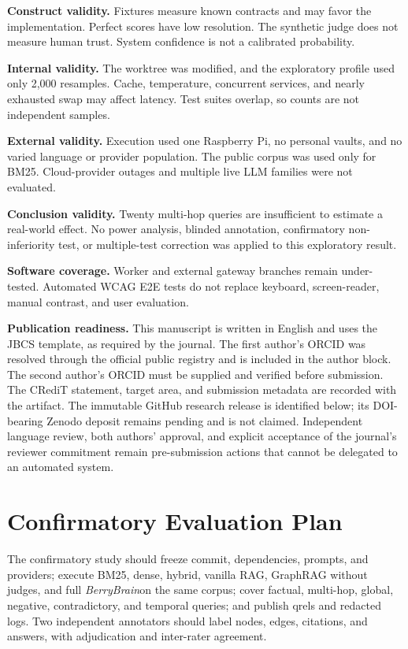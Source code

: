 \documentclass{sbc2023}
\newcommand{\BerryBrain}{\textit{BerryBrain}}
\begin{document}
\textbf{Construct validity.} Fixtures measure known contracts and may favor the implementation.
Perfect scores have low resolution. The synthetic judge does not measure human trust. System
confidence is not a calibrated probability.

\textbf{Internal validity.} The worktree was modified, and the exploratory profile used only 2,000
resamples. Cache, temperature, concurrent services, and nearly exhausted swap may affect latency.
Test suites overlap, so counts are not independent samples.

\textbf{External validity.} Execution used one Raspberry Pi, no personal vaults, and no varied
language or provider population. The public corpus was used only for BM25. Cloud-provider outages
and multiple live LLM families were not evaluated.

\textbf{Conclusion validity.} Twenty multi-hop queries are insufficient to estimate a real-world
effect. No power analysis, blinded annotation, confirmatory non-inferiority test, or multiple-test
correction was applied to this exploratory result.

\textbf{Software coverage.} Worker and external gateway branches remain under-tested. Automated
WCAG E2E tests do not replace keyboard, screen-reader, manual contrast, and user evaluation.

\textbf{Publication readiness.} This manuscript is written in English and uses the JBCS template,
as required by the journal. The first author's ORCID was resolved through the official public
registry and is included in the author block. The second author's ORCID must be supplied and
verified before submission. The CRediT statement, target area, and submission metadata are recorded
with the artifact. The immutable GitHub research release is identified below; its DOI-bearing
Zenodo deposit remains pending and is not claimed. Independent language review, both authors'
approval, and explicit acceptance of the
journal's reviewer commitment remain pre-submission actions that cannot be delegated to an
automated system.

\section{Confirmatory Evaluation Plan}
\label{sec:future}

The confirmatory study should freeze commit, dependencies, prompts, and providers; execute BM25,
dense, hybrid, vanilla RAG, GraphRAG without judges, and full \BerryBrain on the same corpus; cover
factual, multi-hop, global, negative, contradictory, and temporal queries; and publish qrels and
redacted logs. Two independent annotators should label nodes, edges, citations, and answers, with
adjudication and inter-rater agreement.
\end{document}
